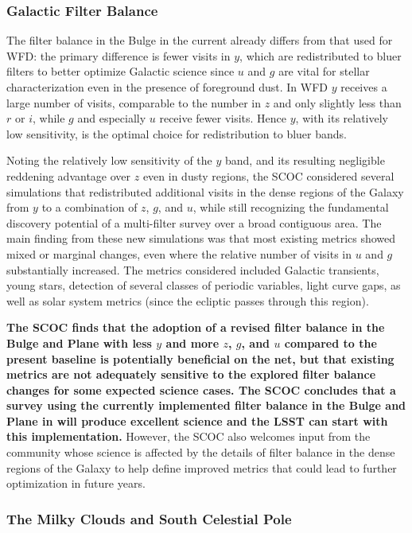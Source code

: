 \subsubsection{Galactic Filter Balance}\label{sec:subG:filterbalance}

The filter balance in the Bulge in the current  already differs from that used for WFD: the primary difference is fewer visits in $y$, which are redistributed to bluer filters to better optimize Galactic science since $u$ and $g$ are vital for stellar characterization even in the presence of foreground dust. In WFD $y$ receives a large number of visits, comparable to the number in $z$ and only slightly less than $r$ or $i$, while $g$ and especially $u$ receive fewer visits. Hence $y$, with its relatively low sensitivity, is the optimal choice for redistribution to bluer bands.

Noting the relatively low sensitivity of the $y$ band, and its resulting negligible reddening advantage over $z$ even in dusty regions, the SCOC considered several simulations that redistributed additional visits in the dense regions of the Galaxy from $y$ to a combination of $z$, $g$, and $u$, while still recognizing the fundamental discovery potential of a multi-filter survey over a broad contiguous area. The main finding from these new simulations was that most existing metrics showed mixed or marginal changes, even where the relative number of visits in $u$ and $g$ substantially increased. The metrics considered included Galactic transients, young stars, detection of several classes of periodic variables, light curve gaps, as well as solar system metrics (since the ecliptic passes through this region).

{\bf The SCOC finds that the adoption of a revised filter balance in the Bulge and Plane with less $y$ and more $z$, $g$, and $u$ compared to the present baseline is potentially beneficial on the net, but that existing metrics are not adequately sensitive to the explored filter balance changes for some expected science cases. The SCOC concludes that a survey using the currently implemented filter balance in the Bulge and Plane in  will produce excellent science and the LSST can start with this implementation.} 
However, the SCOC also welcomes input from the community whose science is affected by the details of filter balance in the dense regions of the Galaxy to help define improved metrics that could lead to further optimization in future years.


\subsubsection{The Milky Clouds and South Celestial Pole}\label{sec:subG:specialregions}

